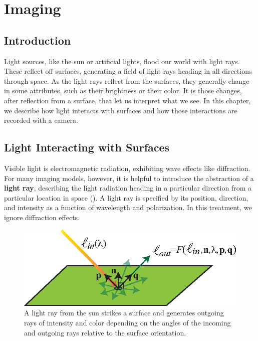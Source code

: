 \chapter{Imaging}
\label{chapter:imaging}


\section{Introduction}

Light sources, like the sun or artificial lights, flood our world with light rays.   These reflect off surfaces, generating a field of light rays heading in
all directions through space.  As the light rays reflect from the surfaces,
they generally change in some attributes, such as their brightness or their color.  It is those changes, after reflection from a surface, that let us interpret what we see. In this chapter, we describe how light interacts with surfaces and how those interactions are recorded with a camera.


\section{Light Interacting with Surfaces}
\label{sec:light_interacting_with_surfaces}
Visible light is electromagnetic radiation, exhibiting wave effects like diffraction.  For many imaging models, however, it is helpful to introduce the abstraction of a {\bf light ray}, describing the light radiation heading in a particular direction from a particular location in space (\fig{\ref{fig:lightSpray}}).  A light ray is specified by its position, direction, and intensity as a function of wavelength and polarization.  In this treatment, we ignore diffraction effects.

\begin{figure}
\centerline{
\includegraphics[width=0.7\linewidth]{figures/imaging/brdf.eps}}
\caption{A light ray from the sun strikes a surface and generates outgoing rays of intensity and color depending on the angles of the incoming and outgoing rays relative to the surface orientation.}
\label{fig:lightSpray}
\end{figure}


